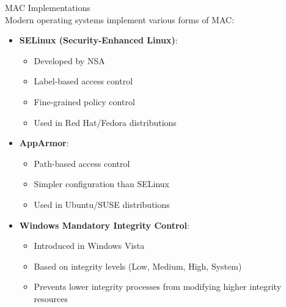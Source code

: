 \begin{concept}{MAC Implementations}\\
Modern operating systems implement various forms of MAC:
\begin{itemize}
    \item \textbf{SELinux (Security-Enhanced Linux)}:
    \begin{itemize}
        \item Developed by NSA
        \item Label-based access control
        \item Fine-grained policy control
        \item Used in Red Hat/Fedora distributions
    \end{itemize}
    \item \textbf{AppArmor}:
    \begin{itemize}
        \item Path-based access control
        \item Simpler configuration than SELinux
        \item Used in Ubuntu/SUSE distributions
    \end{itemize}
    \item \textbf{Windows Mandatory Integrity Control}:
    \begin{itemize}
        \item Introduced in Windows Vista
        \item Based on integrity levels (Low, Medium, High, System)
        \item Prevents lower integrity processes from modifying higher integrity resources
    \end{itemize}
\end{itemize}
\end{concept}

